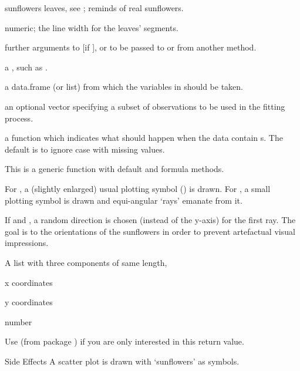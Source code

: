 \begin{Arguments}
\begin{ldescription}
sunflowers leaves, see ;
 reminds of real sunflowers.
\item[\code{seg.lwd}] numeric; the line width for the leaves' segments.
\item[\code{...}] further arguments to  [if
], or to be passed to or from another method.
\item[\code{formula}] a , such as .
\item[\code{data}] a data.frame (or list) from which the variables in
 should be taken.
\item[\code{subset}] an optional vector specifying a subset of observations
to be used in the fitting process.
\item[\code{na.action}] a function which indicates what should happen
when the data contain s.  The default is to ignore case
with missing values.
\end{ldescription}
\end{Arguments}
%
\begin{Details}\relax
This is a generic function with default and formula methods.

For , a (slightly enlarged) usual plotting symbol
() is drawn.  For , a small plotting
symbol is drawn and  equi-angular `rays'
emanate from it.

If  and , a random direction
is chosen (instead of the y-axis) for the first ray.  The goal is to
 the orientations of the sunflowers in order to
prevent artefactual visual impressions.
\end{Details}
%
\begin{Value}
A list with three components of same length,
\begin{ldescription}
\item[\code{x}] x coordinates
\item[\code{y}] y coordinates
\item[\code{number}] number

\end{ldescription}
Use  (from package
) if you are only interested in this return value.
\end{Value}
%
\begin{Section}{Side Effects}
A scatter plot is drawn with `sunflowers' as symbols.
\end{Section}
